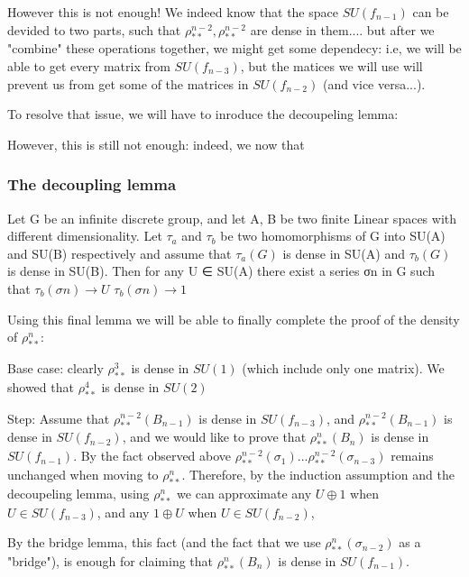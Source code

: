 \documentclass{article}
\begin{document}
However this is not enough! We indeed know that the space  $SU(f_{n-1})$ can be devided to two parts, such that  $\rho^{n-2}_{**},  \rho^{n-2}_{**}$ are dense in them.... but after we "combine" these operations together, we might get some dependecy: i.e, we will be able to get every matrix from $SU(f_{n-3})$, but the matices we will use will prevent us from get some of the matrices in $SU(f_{n-2})$ (and vice versa...).

To resolve that issue, we will have to inroduce the decoupeling lemma:

However, this is still not enough: indeed, we now that 
\subsubsection{The decoupling lemma}
Let G be an infinite discrete group, and let A, B be two finite Linear spaces with different dimensionality. Let $\tau_{a}$ and $\tau_{b}$ be
two homomorphisms of G into SU(A) and SU(B) respectively and assume that $\tau_{a}(G)$
is dense in SU(A) and $\tau_{b}(G)$ is dense in SU(B). Then for any U ∈ SU(A) there exist
a series {σn} in G such that
$\tau_{b}(σn) → U$
$\tau_{b}(σn) → 1$


Using this final lemma we will be able to finally complete the proof of the density of  $\rho^{n}_{**}$:

Base case: clearly $\rho^{3}_{**}$ is dense in $SU(1)$ (which include only one matrix).
            We showed that $\rho^{4}_{**}$ is dense in $SU(2)$
            
Step: Assume that  $\rho^{n-2}_{**}(B_{n-1})$ is dense in $SU(f_{n-3})$, and  $\rho^{n-2}_{**}(B_{n-1})$ is dense in $SU(f_{n-2})$, and we would like to prove that  $\rho^{n}_{**}(B_{n})$ is dense in $SU(f_{n-1})$. By the fact observed above $\rho^{n-2}_{**}(\sigma_{1}) ... \rho^{n-2}_{**}(\sigma_{n-3})$ remains unchanged when moving to  $\rho^{n}_{**}$. Therefore, by the induction assumption and the decoupeling lemma, using $\rho^{n}_{**}$ we can approximate any $U \oplus 1$ when $U \in SU(f_{n-3})$, and any  $1 \oplus U$ when $U \in SU(f_{n-2})$,

By the bridge lemma, this fact (and the fact that we use  $\rho^{n}_{**}(\sigma_{n-2})$ as a "bridge"), is enough for claiming that  $\rho^{n}_{**}(B_{n})$ is dense in $SU(f_{n-1})$.
\end{document}
